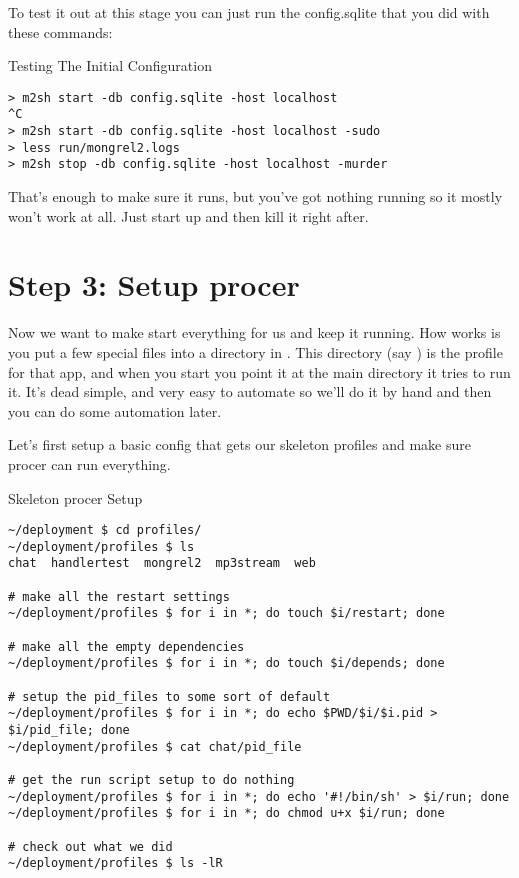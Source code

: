 To test it out at this stage you can just run the config.sqlite that you
did with these commands:

\begin{code}{Testing The Initial Configuration}
\begin{Verbatim}
> m2sh start -db config.sqlite -host localhost
^C
> m2sh start -db config.sqlite -host localhost -sudo
> less run/mongrel2.logs
> m2sh stop -db config.sqlite -host localhost -murder
\end{Verbatim}
\end{code}

That's enough to make sure it runs, but you've got nothing running
so it mostly won't work at all.  Just start up and then kill it
right after.


\section{Step 3: Setup procer}

Now we want to make  start everything for us and keep
it running.  How  works is you put a few special
files into a directory in .  This directory (say )
is the profile for that app, and when you start  you
point it at the main  directory it tries to run it.
It's dead simple, and very easy to automate so we'll do it by hand
and then you can do some automation later.

Let's first setup a basic config that gets our skeleton profiles
and make sure procer can run everything.

\begin{code}{Skeleton procer Setup}
\begin{Verbatim}
~/deployment $ cd profiles/
~/deployment/profiles $ ls
chat  handlertest  mongrel2  mp3stream	web

# make all the restart settings
~/deployment/profiles $ for i in *; do touch $i/restart; done

# make all the empty dependencies
~/deployment/profiles $ for i in *; do touch $i/depends; done

# setup the pid_files to some sort of default
~/deployment/profiles $ for i in *; do echo $PWD/$i/$i.pid > $i/pid_file; done
~/deployment/profiles $ cat chat/pid_file 

# get the run script setup to do nothing
~/deployment/profiles $ for i in *; do echo '#!/bin/sh' > $i/run; done
~/deployment/profiles $ for i in *; do chmod u+x $i/run; done

# check out what we did
~/deployment/profiles $ ls -lR
\end{Verbatim}
\end{code}

